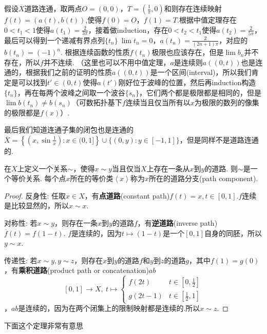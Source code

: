 假设$X$道路连通，取两点$O=(0,0)$，$T=(\frac{1}{\pi},0)$和则存在连续映射$f(t)=(a(t),b(t))$,使得$f(0)=O$，$f(1)=T$.根据中值定理存在$0<t_1<1$使得$a(t_1)=\frac{2}{3\pi}$，接着做induction，存在$0<t_2<t_1$使得$a(t_2) = \frac{2}{5\pi}$，最后可以得到一个递减有界点列$\{t_n\} \ \lim t_n = 0$，$a(t_n) = \frac{2}{(2n+1)\pi}$，对应的$b(t_n)=(-1)^n$. 根据连续函数的性质${f(t_n)}$极限也应该存在，但是$\lim b_n$并不存在，所以$f$并不连续. （这里也可以不用中值定理，$a$是连续则$a((0,t))$也是连通的，根据我们之前的证明的性质$a((0,t))$是一个区间\rm(interval)，所以我们肯定是可以找到$t' \in (0,t)$使得$a(t')$刚好位于波峰的位置，然后再induction构造$\{t_n\}$，再在每两个波峰之间取一个波谷$\{s_n\}$，它们两个都是极限都是相同的，但是$\lim b(t_n) \neq b(s_n)$（可数拓扑基下$f$连续当且仅当所有以$x$为极限的数列的像集的极限都是$f(x)$）.


最后我们知道连通子集的闭包也是连通的$\overline{X} = \left\{  \left( x, \sin \tfrac{1}{x}  \right ) :  x \in (0,1] \right\} \cup \{(0,y) : y \in [-1,1]\}$，但是同样不是道路连通的.

\begin{proposition}
\rm 在$X$上定义一个关系$\sim$，使得$x \sim y$当且仅当$X$上存在一条从$x$到$y$的道路. 则$\sim$是一个等价关系. 每个点$x$所在的等价类$\left<x \right>$称为$x$所在的道路分支(path component).
\end{proposition}

\begin{proof}
反身性: 任取$x \in X$，有\textbf{点道路}(constant path)$f(t) = x,t \in [0,1]$.$f$连续是比较显然的，所以$x \sim x$.

对称性: 若$x \sim y$，则存在一条$x$到$y$的道路$f$，有\textbf{逆道路}(inverse path)$\overline{f}(t)=f(1-t)$. $f$是连续的，因为$t \mapsto (1-t)$是一个$[0,1]$自身的同胚，所以$y \sim x$.

传递性: 若$x \sim y, y \sim z$，则存在$x$到$y$的道路$f$和$y$到$z$的道路$g$，其中$f(1) = g(0)$，有\textbf{乘积道路}(product path or concatenation)$ab$ \[[0,1]\rightarrow X, \ t \mapsto \begin{cases} f(2t) & t \in [0,\frac{1}{2}] \\ g(2t-1) & t \in [\frac{1}{2},1] \end{cases}\]，$ab$是连续的，因为在两个闭集上的限制映射都是连续的.所以$x \sim z$.
\end{proof}

下面这个定理非常有意思

